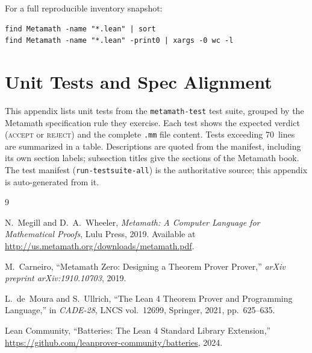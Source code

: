 \documentclass[11pt]{article}
\begin{document}
For a full reproducible inventory snapshot:
\begin{verbatim}
find Metamath -name "*.lean" | sort
find Metamath -name "*.lean" -print0 | xargs -0 wc -l
\end{verbatim}

\section{Unit Tests and Spec Alignment}
\label{app:tests}

This appendix lists unit tests from the \texttt{metamath-test} test
suite, grouped by the Metamath specification rule they
exercise.  Each test shows the expected verdict (\textsc{accept} or
\textsc{reject}) and the complete \texttt{.mm} file content.
Tests exceeding 70~lines are summarized in a table.
Descriptions are quoted from the manifest, including its own section
labels; subsection titles give the sections of the Metamath book.
The test manifest (\texttt{run-testsuite-all}) is the authoritative
source; this appendix is auto-generated from it.




\begin{thebibliography}{9}

N.~Megill and D.~A.~Wheeler,
\emph{Metamath: A Computer Language for Mathematical Proofs},
Lulu Press, 2019.
Available at \url{http://us.metamath.org/downloads/metamath.pdf}.

M.~Carneiro,
``Metamath Zero: Designing a Theorem Prover Prover,''
\emph{arXiv preprint arXiv:1910.10703}, 2019.

L.~de~Moura and S.~Ullrich,
``The Lean 4 Theorem Prover and Programming Language,''
in \emph{CADE-28}, LNCS vol.~12699, Springer, 2021, pp.~625--635.

Lean Community,
``Batteries: The Lean 4 Standard Library Extension,''
\url{https://github.com/leanprover-community/batteries}, 2024.

\end{thebibliography}
\end{document}
